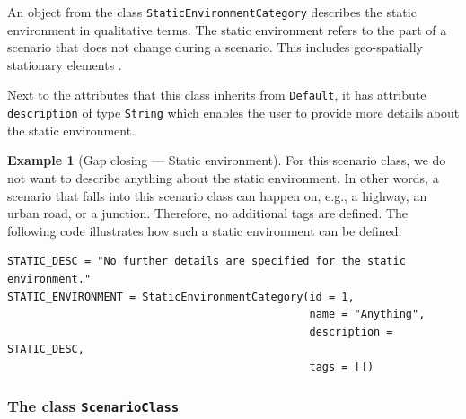 \documentclass[10pt,final,a4paper,oneside,onecolumn]{article}
\theoremstyle{plain}\newtheorem{definition}{Definition}[section]    %
\theoremstyle{definition}\newtheorem{example}{Example}[section]     %
\theoremstyle{remark}\newtheorem{remarkenv}{Remark}[section]        %
\begin{document}
An object from the class \texttt{StaticEnvironmentCategory} describes the static environment in qualitative terms. The static environment refers to the part of a scenario that does not change during a scenario. This includes geo-spatially stationary elements \cite{ulbrich2015}.

Next to the attributes that this class inherits from \texttt{Default}, it has attribute \texttt{description} of type \texttt{String} which enables the user to provide more details about the static environment.

\begin{example}[Gap closing --- Static environment] \label{example:static environment category}
	For this scenario class, we do not want to describe anything about the static environment. In other words, a scenario that falls into this scenario class can happen on, e.g., a highway, an urban road, or a junction. Therefore, no additional tags are defined. The following code illustrates how such a static environment can be defined.
	
	\begin{lstlisting}[caption=Code for instantiating an object of \texttt{StaticEnvironmentCategory}.]
STATIC_DESC = "No further details are specified for the static environment."
STATIC_ENVIRONMENT = StaticEnvironmentCategory(id = 1,
                                               name = "Anything",
                                               description = STATIC_DESC,
                                               tags = [])
	\end{lstlisting}
\end{example}

\subsubsection{The class \texttt{ScenarioClass}}
\label{sec:scenario class}
\end{document}
